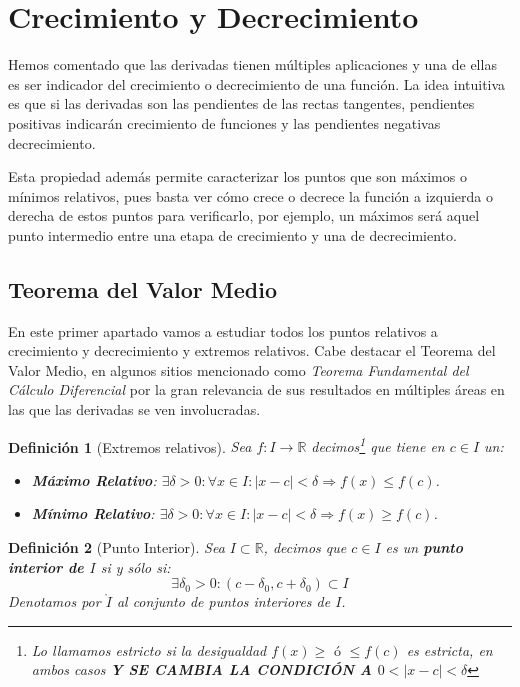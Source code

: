 \documentclass[10pt,a4paper,openright]{book}
\theoremstyle{break}
\newtheorem{defi}{Definición}[chapter]
\begin{document}
\section{Crecimiento y Decrecimiento}
Hemos comentado que las derivadas tienen múltiples aplicaciones y una de ellas es ser indicador del crecimiento o decrecimiento de una función. La idea intuitiva es que si las derivadas son las pendientes de las rectas tangentes, pendientes positivas indicarán crecimiento de funciones y las pendientes negativas decrecimiento.

Esta propiedad además permite caracterizar los puntos que son máximos o mínimos relativos, pues basta ver cómo crece o decrece la función a izquierda o derecha de estos puntos para verificarlo, por ejemplo, un máximos será aquel punto intermedio entre una etapa de crecimiento y una de decrecimiento.

\subsection{Teorema del Valor Medio}
En este primer apartado vamos a estudiar todos los puntos relativos a crecimiento y decrecimiento y extremos relativos. Cabe destacar el Teorema del Valor Medio, en algunos sitios mencionado como \textit{Teorema Fundamental del Cálculo Diferencial} por la gran relevancia de sus resultados en múltiples áreas en las que las derivadas se ven involucradas.

\begin{defi}[Extremos relativos]
Sea $f:I\rightarrow \mathbb R$ decimos\footnote{Lo llamamos estricto si la desigualdad $f(x)\geq \mbox{ ó }\leq f(c)$ es estricta, en ambos casos \textbf{Y SE CAMBIA LA CONDICIÓN A $0<|x-c|<\delta$}} que tiene en $c\in I$ un:
\begin{itemize}
\item \textbf{Máximo Relativo}: $\exists \delta>0: \forall x \in I: |x-c|<\delta \Rightarrow f(x)\leq f(c)$.
\item \textbf{Mínimo Relativo}: $\exists \delta>0: \forall x \in I: |x-c|<\delta \Rightarrow f(x)\geq f(c)$.
\end{itemize}
\end{defi}

\begin{defi}[Punto Interior]
Sea $I\subset\mathbb{R}$, decimos que $c\in I$ es un \textbf{punto interior de $I$} si y sólo si:
$$\exists \delta_0 >0: (c-\delta_0, c+\delta_0)\subset I$$
Denotamos por $\mathring{I}$ al conjunto de puntos interiores de $I$.
\end{defi}
\end{document}
